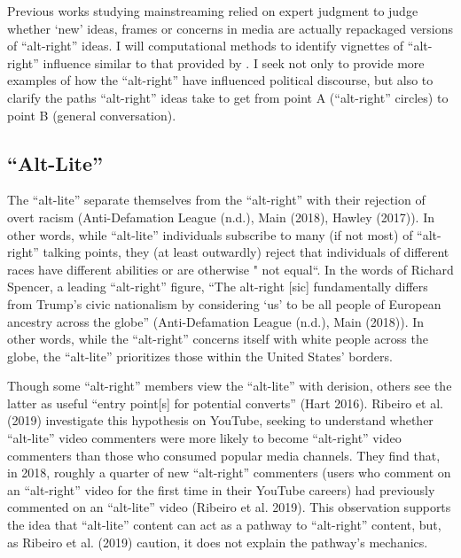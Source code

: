 \documentclass[acmlarge, screen, authorversion]{acmart}
\begin{document}
 Previous works studying mainstreaming relied on expert judgment to judge whether `new' ideas, frames or concerns in media are actually repackaged versions of ``alt-right'' ideas. I will computational methods to identify vignettes of ``alt-right'' influence similar to that provided by \citet{sternProudBoysWhite2019}. I seek not only to provide more examples of how the ``alt-right'' have influenced political discourse, but also to clarify the paths ``alt-right'' ideas take to get from point A (``alt-right'' circles) to point B (general conversation). 

\subsection{“Alt-Lite”}

The “alt-lite” separate themselves from the “alt-right” with their
rejection of overt racism (Anti-Defamation League (n.d.), Main (2018),
Hawley (2017)). In other words, while “alt-lite” individuals subscribe
to many (if not most) of “alt-right” talking points, they (at least
outwardly) reject that individuals of different races have different
abilities or are otherwise " not equal“. In the words of Richard
Spencer, a leading ``alt-right'' figure, “The alt-right [sic] fundamentally
differs from Trump’s civic nationalism by considering ‘us’ to be all
people of European ancestry across the globe” (Anti-Defamation League
(n.d.), Main (2018)). In other words, while the “alt-right” concerns
itself with white people across the globe, the “alt-lite” prioritizes
those within the United States’ borders.

Though some “alt-right” members view the “alt-lite” with derision,
others see the latter as useful “entry point[s] for potential converts”
(Hart 2016). Ribeiro et al. (2019) investigate this hypothesis on
YouTube, seeking to understand whether “alt-lite” video commenters were
more likely to become “alt-right” video commenters than those who
consumed popular media channels. They find that, in 2018, roughly a
quarter of new “alt-right” commenters (users who comment on an
“alt-right” video for the first time in their YouTube careers) had
previously commented on an “alt-lite” video (Ribeiro et al. 2019). This
observation supports the idea that “alt-lite” content can act as a
pathway to “alt-right” content, but, as Ribeiro et al. (2019) caution,
it does not explain the pathway’s mechanics.
\end{document}
